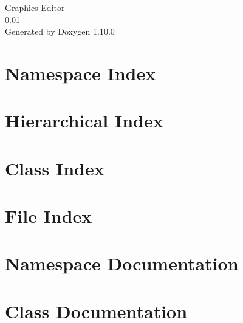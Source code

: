 \documentclass[twoside]{book}
\newcommand{\+}{\discretionary{\mbox{\scriptsize$\hookleftarrow$}}{}{}}
\newcommand{\clearemptydoublepage}{%
    \newpage{\pagestyle{empty}\cleardoublepage}%
  }
\begin{document}
  \raggedbottom
    \hypersetup{pageanchor=false,
                bookmarksnumbered=true,
                pdfencoding=unicode
               }
  \begin{titlepage}
  \vspace*{7cm}
  \begin{center}%
  {\Large Graphics Editor}\\
  [1ex]\large 0.\+01 \\
  \vspace*{1cm}
  {\large Generated by Doxygen 1.10.0}\\
  \end{center}
  \end{titlepage}
  \clearemptydoublepage
  \tableofcontents
  \clearemptydoublepage
  \hypersetup{pageanchor=true}
\chapter{Namespace Index}

\chapter{Hierarchical Index}

\chapter{Class Index}

\chapter{File Index}

\chapter{Namespace Documentation}

\chapter{Class Documentation}











\end{document}

